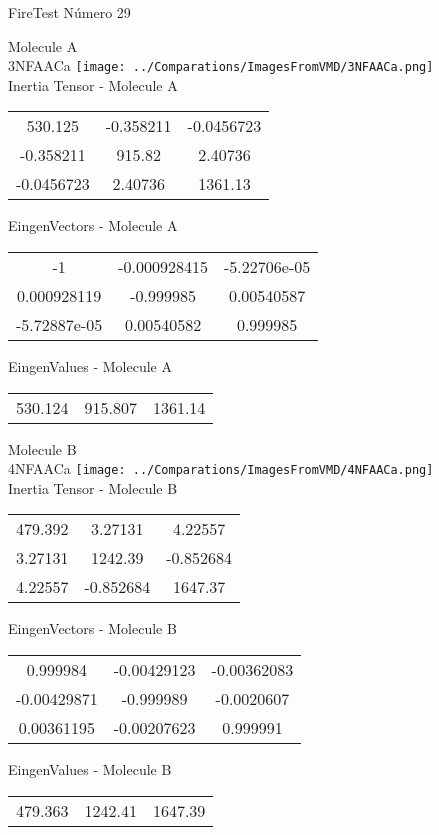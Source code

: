 \vtab[-2cm]
\begin{center}
{\large FireTest \tab Número 29}
\end{center}
\begin{multicols}{2}
\begin{center}

Molecule A \\ 
3NFAACa
\texttt{[image: ../Comparations/ImagesFromVMD/3NFAACa.png]}
\\
Inertia Tensor - Molecule A \\
\vtab

\begin{tabular}{|c c c|}
530.125	 & 	-0.358211	 & 	-0.0456723	 \\
-0.358211	 & 	915.82	 & 	2.40736	 \\
-0.0456723	 & 	2.40736	 & 	1361.13
\end{tabular}

\vtab
 EingenVectors - Molecule A     \\
\vtab
\begin{tabular}{|c c c|}
-1	 & 	-0.000928415	 & 	-5.22706e-05	 \\
0.000928119	 & 	-0.999985	 & 	0.00540587	 \\
-5.72887e-05	 & 	0.00540582	 & 	0.999985
\end{tabular}

\vtab
 EingenValues - Molecule A     \\
\vtab
\begin{tabular}{|c c c|}
530.124	 & 	915.807	 & 	1361.14	 \\
\end{tabular}
\columnbreak

Molecule B \\ 
4NFAACa
\texttt{[image: ../Comparations/ImagesFromVMD/4NFAACa.png]}
\\
Inertia Tensor - Molecule B \\
\vtab

\begin{tabular}{|c c c|}
479.392	 & 	3.27131	 & 	4.22557	 \\
3.27131	 & 	1242.39	 & 	-0.852684	 \\
4.22557	 & 	-0.852684	 & 	1647.37
\end{tabular}

\vtab
 EingenVectors - Molecule B     \\
\vtab
\begin{tabular}{|c c c|}
0.999984	 & 	-0.00429123	 & 	-0.00362083	 \\
-0.00429871	 & 	-0.999989	 & 	-0.0020607	 \\
0.00361195	 & 	-0.00207623	 & 	0.999991
\end{tabular}

\vtab
 EingenValues - Molecule B     \\
\vtab
\begin{tabular}{|c c c|}
479.363	 & 	1242.41	 & 	1647.39	 \\
\end{tabular}

\end{center}
\end{multicols}
